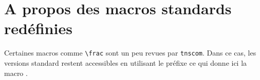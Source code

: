 \documentclass[12pt,a4paper]{article}
\begin{document}
\section{A propos des macros standards redéfinies}

Certaines macros comme \verb+\frac+ sont un peu revues par \verb+tnscom+.
Dans ce cas, les versions standard restent accessibles en utilisant le préfixe  ce qui donne ici la macro .
\end{document}
